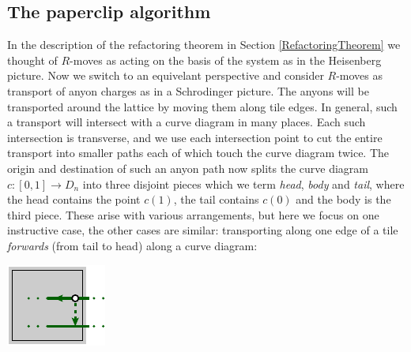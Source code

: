 %



%
%

\subsection{The paperclip algorithm}

In the description of the refactoring theorem
in Section \ref{RefactoringTheorem}
we thought of $R$-moves as acting on the basis of
the system as in the Heisenberg picture.
Now we switch to an equivelant perspective and
consider $R$-moves as transport of anyon charges
as in a Schrodinger picture.
The anyons will be transported around the lattice
by moving them along tile edges.
In general, such a transport will intersect with a
curve diagram in many places.
Each such intersection is transverse,
and we use each intersection point to cut
the entire transport into smaller paths each of
which touch the curve diagram twice.
The origin and destination of such an anyon path
now splits the curve diagram $c:[0, 1]\to D_n$ 
into three disjoint pieces which we term
\emph{head}, \emph{body} and \emph{tail}, where
the head contains the point $c(1)$, the tail
contains $c(0)$ and the body is the third piece.
These arise with various arrangements, but here
we focus on one instructive case, the
other cases are similar:
transporting along one edge of a tile \emph{forwards} 
(from tail to head) along a curve diagram:
\begin{center}
\includegraphics[]{pic-move-anyon.pdf}
\end{center}

